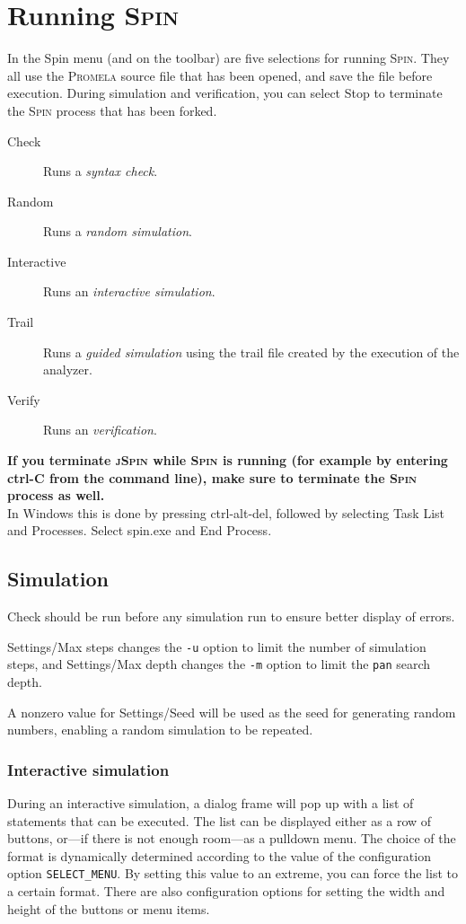 \documentclass[11pt]{article}
\newcommand{\spn}{\textsc{Spin}}
\newcommand{\prm}{\textsc{Promela}}
\newcommand{\js}{\textsc{jSpin}}
\newcommand{\p}[1]{\texttt{#1}}
\newcommand{\bu}[1]{\textsf{#1}}
\begin{document}
\section{Running \spn{}}\label{s.run}
In the \bu{Spin} menu (and on the toolbar) are five selections for
running \spn{}. They all use the \prm{} source file that has been opened,
and save the file before execution.
During simulation and verification,
you can select \bu{Stop} to terminate the \spn{} process that has been forked.
\begin{description}
\item[\bu{Check}] Runs a \emph{syntax check}.
\item[\bu{Random}] Runs a \emph{random simulation}.
\item[\bu{Interactive}] Runs an \emph{interactive simulation}.
\item[\bu{Trail}] Runs a \emph{guided simulation} using the trail
file created by the execution of the analyzer.
\item[\bu{Verify}] Runs an \emph{verification}.
\end{description}
\textbf{If you terminate \js{} while \spn{} is running (for example by entering \bu{ctrl-C} from the
command line), make sure to terminate the \spn{} process as well.}\\
In Windows this is done by pressing \bu{ctrl-alt-del}, followed by
selecting \bu{Task List} and \bu{Processes}. Select \bu{spin.exe} and
\bu{End Process}.

\subsection{Simulation}\label{s.sim}
\bu{Check} should be run before any simulation run to ensure better display
of errors.

\bu{Settings/Max steps} changes the \p{-u} option to limit the number of
simulation steps, and \bu{Settings/Max depth} changes the \p{-m} option
to limit the \p{pan} search depth.

A nonzero value for \bu{Settings/Seed} will be used as the seed for generating
random numbers, enabling a random simulation to be repeated.

\subsubsection{Interactive simulation}
During an interactive simulation, a dialog frame will pop up with a list
of statements that can be executed. The list can be displayed either as
a row of buttons, or---if there is not enough room---as a pulldown menu.
The choice of the format is dynamically determined according to the
value of the configuration option \p{SELECT\_MENU}. By setting this
value to an extreme, you can force the list to a certain format. There
are also configuration options for setting the width and height of the
buttons or menu items.
\end{document}
